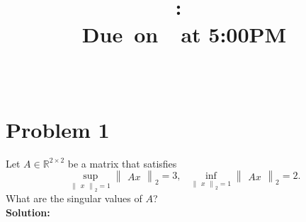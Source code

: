 \documentclass{article}
\title{
    \vspace{2in}
    \textmd{\textbf{\hmwkClass:\ \hmwkTitle}}\\
    \normalsize\vspace{0.1in}\small{Due\ on\ \hmwkDueDate\ at 5:00PM}\\
    \vspace{0.1in}\large{\textit{\hmwkClassInstructor\ \hmwkClassTime}}
    \vspace{3in}
}
\author{\hmwkAuthorName}
\date{}
\begin{document}
\maketitle

\pagebreak
\section*{Problem 1}
Let $A \in \mathbb{R}^{2 \times 2}$ be a matrix that satisfies 
\[
\sup_{\begin{Vmatrix}x\end{Vmatrix}_2 = 1}
\begin{Vmatrix}
    Ax
\end{Vmatrix}_2 = 3, 
~~~ 
\inf_{\begin{Vmatrix}x\end{Vmatrix}_2 = 1}
\begin{Vmatrix}
    Ax
\end{Vmatrix}_2 = 2. 
\]
What are the singular values of $A$?\\

\textbf{Solution:}
\end{document}
